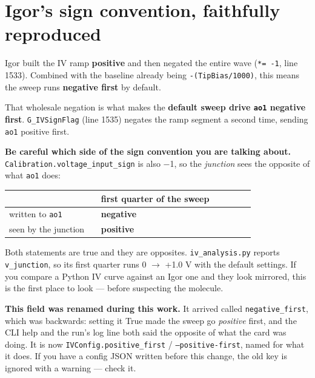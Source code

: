 \section{Igor's sign convention, faithfully reproduced}

Igor built the IV ramp \textbf{positive} and then negated the entire wave (\texttt{*= -1}, line 1533). Combined with the baseline already being \texttt{-(Tip\discretionary{}{}{}Bias/\discretionary{}{}{}1000)}, this means the sweep runs \textbf{negative first} by default.

That wholesale negation is what makes the \textbf{default sweep drive \texttt{ao1} negative first}. \texttt{G\_\discretionary{}{}{}IVSign\discretionary{}{}{}Flag} (line 1535) negates the ramp segment a second time, sending \texttt{ao1} positive first.

\textbf{Be careful which side of the sign convention you are talking about.} \texttt{Calibration.\discretionary{}{}{}voltage\_\discretionary{}{}{}input\_\discretionary{}{}{}sign} is also −1, so the \emph{junction} sees the opposite of what \texttt{ao1} does:

\small\setlength{\LTleft}{0pt}\setlength{\LTright}{\fill}
\begin{longtable}{@{}>{\raggedright\arraybackslash}p{0.34\linewidth}>{\raggedright\arraybackslash}p{0.58\linewidth}@{}}
\toprule
\textbf{} & \textbf{first quarter of the sweep} \\
\midrule\endhead
written to \texttt{ao1} & \textbf{negative} \\
seen by the junction & \textbf{positive} \\
\bottomrule
\end{longtable}
\normalsize

Both statements are true and they are opposites. \texttt{iv\_\discretionary{}{}{}analysis.\discretionary{}{}{}py} reports \texttt{v\_\discretionary{}{}{}junction}, so its first quarter runs 0 $\rightarrow$ +1.0 V with the default settings. If you compare a Python IV curve against an Igor one and they look mirrored, this is the first place to look --- before suspecting the molecule.

\begin{warnbox}
\textbf{This field was renamed during this work.} It arrived called \texttt{negative\_\discretionary{}{}{}first}, which was backwards: setting it True made the sweep go \emph{positive} first, and the CLI help and the run's log line both said the opposite of what the card was doing. It is now \texttt{IVConfig.\discretionary{}{}{}positive\_\discretionary{}{}{}first} / \texttt{--positive-first}, named for what it does. If you have a config JSON written before this change, the old key is ignored with a warning --- check it.
\end{warnbox}

